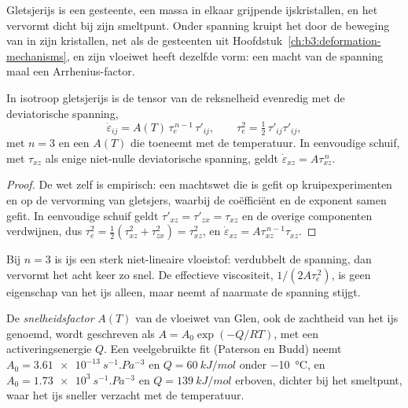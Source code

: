 Gletsjerijs is een gesteente, een massa in elkaar grijpende ijskristallen, en het
vervormt dicht bij zijn smeltpunt. Onder spanning kruipt het door de
beweging van  in zijn kristallen, net als de gesteenten uit
Hoofdstuk~\ref{ch:b3:deformation-mechanisms}, en zijn vloeiwet heeft dezelfde
vorm: een macht van de spanning maal een Arrhenius-factor.

\begin{theorem}\label{thm:b3:glaciology:glen}
In isotroop gletsjerijs is de tensor van de reksnelheid evenredig met de
deviatorische spanning,
\[
\dot\varepsilon_{ij} = A(T)\,\tau_e^{\,n-1}\,\tau'_{ij}, \qquad
\tau_e^2 = \tfrac12\,\tau'_{ij}\tau'_{ij},
\]
met $n = 3$ en een  $A(T)$ die toeneemt met de temperatuur. In
eenvoudige schuif, met $\tau_{xz}$ als enige niet-nulle deviatorische spanning, geldt
$\dot\varepsilon_{xz} = A\tau_{xz}^{\,n}$.
\end{theorem}

\begin{proof}
De wet zelf is empirisch: een machtswet die is gefit op kruipexperimenten en
op de vervorming van gletsjers, waarbij de coëfficiënt en de exponent
samen gefit. In eenvoudige schuif geldt $\tau'_{xz} = \tau'_{zx} = \tau_{xz}$ en de
overige componenten verdwijnen, dus $\tau_e^2 = \tfrac12(\tau_{xz}^2 +
\tau_{zx}^2) = \tau_{xz}^2$, en $\dot\varepsilon_{xz} = A\tau_{xz}^{\,n-1}
\tau_{xz}$.
\end{proof}

Bij $n = 3$ is ijs een sterk niet-lineaire vloeistof: verdubbelt de spanning, dan
vervormt het acht keer zo snel. De effectieve viscositeit, $1/(2A\tau_e^{\,2})$,
is geen eigenschap van het ijs alleen, maar neemt af naarmate de spanning stijgt.

\begin{definition}\label{def:b3:glaciology:glen}
De \emph{snelheidsfactor} $A(T)$ van de vloeiwet van Glen, ook
de zachtheid van het ijs genoemd, wordt geschreven als $A = A_0\exp(-Q/RT)$, met
een activeringsenergie $Q$. Een veelgebruikte fit (Paterson en Budd) neemt $A_0 =
\qty{3.61e-13}{s^{-1}.Pa^{-3}}$ en $Q = \qty{60}{kJ/mol}$ onder
\qty{-10}{\celsius}, en $A_0 = \qty{1.73e3}{s^{-1}.Pa^{-3}}$ en $Q =
\qty{139}{kJ/mol}$ erboven, dichter bij het smeltpunt, waar het ijs
sneller verzacht met de temperatuur.
\end{definition}

